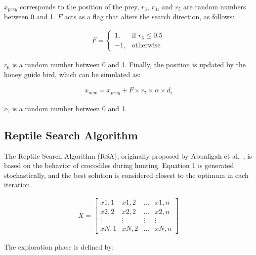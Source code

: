 \documentclass{elsarticle}
\begin{document}
\noindent $x_{prey}$ corresponds to the position of the prey, $r_3$, $r_4$, and $r_5$ are random numbers between 0 and 1. $F$ acts as a flag that alters the search direction, as follows:

\begin{equation}
\begin{gathered}
F=
\begin{cases}
1, & \text{if } r_6 \leq 0.5 \\
-1, & \text{otherwise}
\end{cases}
\end{gathered}
\label{eq31}
\end{equation}    

\noindent $r_6$ is a random number between 0 and 1. Finally, the position is updated by the honey guide bird, which can be simulated as:

\begin{equation}
\begin{gathered}
x_{new} = x_{prey} + F \times r_7 \times \alpha \times d_i
\end{gathered}
\label{eq32}
\end{equation}

\noindent $r_7$ is a random number between 0 and 1.

\subsection{Reptile Search Algorithm}

\noindent The Reptile Search Algorithm (RSA), originally proposed by Abualigah et al.~\cite{Abualigah2022}, is based on the behavior of crocodiles during hunting. 
\noindent Equation 1 is generated stochastically, and the best solution is considered closest to the optimum in each iteration.

\begin{equation}
\begin{gathered}
X = \begin{bmatrix}
  x1,1 & x1,2 & ... & x1,n  \\
  x2,2 & x2,2 & ... & x2,n  \\
  \vdots & \vdots & \vdots & \vdots \\
  xN,1 & xN,2 & ... & xN,n
\end{bmatrix}
\end{gathered}
\label{eq33}
\end{equation}

\noindent The exploration phase is defined by:
\end{document}
